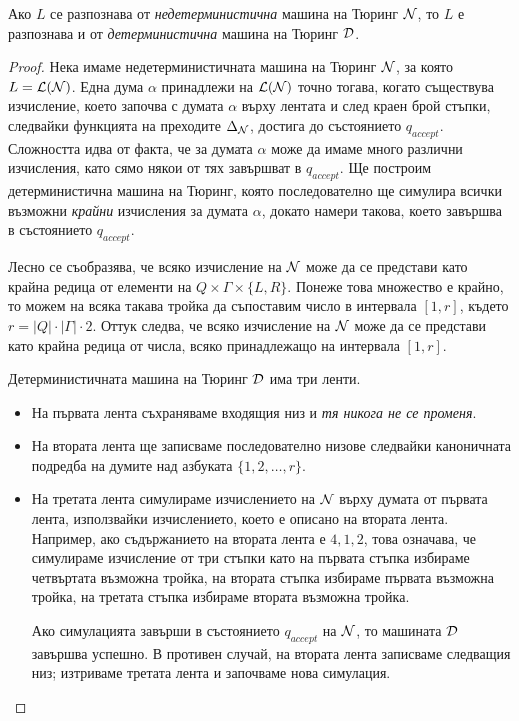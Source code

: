 \begin{framed}
  \begin{thm}
    Ако $L$ се разпознава от {\em недетерминистична} машина на Тюринг $\mathcal{N}$, то $L$
    е разпознава и от {\em детерминистична} машина на Тюринг $\mathcal{D}$.
  \end{thm}
\end{framed}
\begin{proof}
  Нека имаме недетерминистичната машина на Тюринг $\mathcal{N}$, за която $L = \mathcal{L}(\mathcal{N})$.
  Една дума $\alpha$ принадлежи на $\mathcal{L}(\mathcal{N})$ точно тогава, когато съществува изчисление,
  което започва с думата $\alpha$ върху лентата и след краен брой стъпки, следвайки функцията на преходите $\Delta_{\mathcal{N}}$,
  достига до състоянието $q_{accept}$.
  Сложността идва от факта, че за думата $\alpha$ може да имаме много различни изчисления, 
  като сямо някои от тях завършват в $q_{accept}$. Ще построим детерминистична машина на Тюринг,
  която последователно ще симулира всички възможни {\em крайни} изчисления за думата $\alpha$, докато 
  намери такова, което завършва в състоянието $q_{accept}$.
  
  Лесно се съобразява, че всяко изчисление на $\mathcal{N}$ може да се представи като 
  крайна редица от елементи на $Q \times \Gamma \times \{L,R\}$.
  Понеже това множество е крайно, то можем на всяка такава тройка да
  съпоставим число в интервала $[1,r]$, където $r = |Q| \cdot |\Gamma|\cdot2$.
  Оттук следва, че всяко изчисление на $\mathcal{N}$ може да се представи като крайна 
  редица от числа, всяко принадлежащо на интервала $[1,r]$.

  Детерминистичната машина на Тюринг $\mathcal{D}$ има три ленти.
  
  \begin{itemize}
  \item 
    На първата лента съхраняваме входящия низ и {\em тя никога не се променя}.
  \item
    На втората лента ще записваме последователно низове следвайки каноничната подредба на 
    думите над азбуката $\{1,2,\dots,r\}$.
  \item
    На третата лента симулираме изчислението на $\mathcal{N}$ върху думата от първата лента, използвайки изчислението, 
    което е описано на втората лента. Например, ако съдържанието на втората лента е $4,1,2$,
    това означава, че симулираме изчисление от три стъпки като на първата стъпка избираме четвъртата
    възможна тройка, на втората стъпка избираме първата възможна тройка, на третата стъпка избираме втората възможна тройка.
    
    Ако симулацията завърши в състоянието $q_{accept}$ на $\mathcal{N}$, то машината $\mathcal{D}$ завършва успешно.
    В противен случай, на втората лента записваме следващия низ; изтриваме третата лента и започваме нова симулация.
  \end{itemize}
\end{proof}

